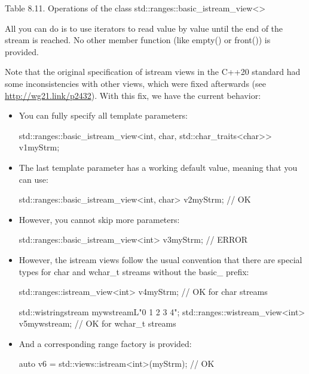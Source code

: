 \begin{center}
Table 8.11. Operations of the class std::ranges::basic\_istream\_view<>
\end{center}

All you can do is to use iterators to read value by value until the end of the stream is reached. No other member function (like empty() or front()) is provided.

Note that the original specification of istream views in the C++20 standard had some inconsistencies with other views, which were fixed afterwards (see \url{http://wg21.link/p2432}). With this fix, we have the current behavior:

\begin{itemize}
\item
You can fully specify all template parameters:

\begin{cpp}
std::ranges::basic_istream_view<int, char, std::char_traits<char>> v1{myStrm};
\end{cpp}

\item
The last template parameter has a working default value, meaning that you can use:

\begin{cpp}
std::ranges::basic_istream_view<int, char> v2{myStrm}; // OK
\end{cpp}

\item
However, you cannot skip more parameters:

\begin{cpp}
std::ranges::basic_istream_view<int> v3{myStrm}; // ERROR
\end{cpp}

\item
However, the istream views follow the usual convention that there are special types for char and wchar\_t streams without the basic\_ prefix:

\begin{cpp}
std::ranges::istream_view<int> v4{myStrm}; // OK for char streams

std::wistringstream mywstream{L"0 1 2 3 4"};
std::ranges::wistream_view<int> v5{mywstream}; // OK for wchar_t streams
\end{cpp}

\item
And a corresponding range factory is provided:

\begin{cpp}
auto v6 = std::views::istream<int>(myStrm); // OK
\end{cpp}
\end{itemize}

